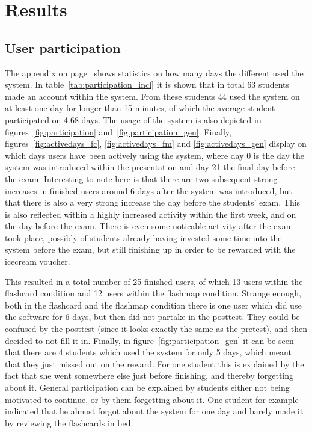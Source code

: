 \chapter{Results}
\label{ch:results}

\section{User participation}

The  appendix on page~\pageref{app:participation} shows statistics on how many days the different used the system. In table~\ref{tab:participation_incl} it is shown that in total 63 students made an account within the system. From these students 44 used the system on at least one day for longer than 15 minutes, of which the average student participated on 4.68 days. The usage of the system is also depicted in figures~\ref{fig:participation} and~\ref{fig:participation_gen}. Finally, figures~\ref{fig:activedays_fc}, \ref{fig:activedays_fm} and \ref{fig:activedays_gen} display on which days users have been actively using the system, where day 0 is the day the system was introduced within the presentation and day 21 the final day before the exam. Interesting to note here is that there are two subsequent strong increases in finished users around 6 days after the system was introduced, but that there is also a very strong increase the day before the students' exam. This is also reflected within a highly increased activity within the first week, and on the day before the exam. There is even some noticable activity after the exam took place, possibly of students already having invested some time into the system before the exam, but still finishing up in order to be rewarded with the icecream voucher.

This resulted in a total number of 25 finished users, of which 13 users within the flashcard condition and 12 users within the flashmap condition. Strange enough, both in the flashcard and the flashmap condition there is one user which did use the software for 6 days, but then did not partake in the posttest. They could be confused by the posttest (since it looks exactly the same as the pretest), and then decided to not fill it in. Finally, in figure~\ref{fig:participation_gen} it can be seen that there are 4 students which used the system for only 5 days, which meant that they just missed out on the reward. For one student this is explained by the fact that she went somewhere else just before finishing, and thereby forgetting about it. General participation can be explained by students either not being motivated to continue, or by them forgetting about it. One student for example indicated that he almost forgot about the system for one day and barely made it by reviewing the flashcards in bed.

